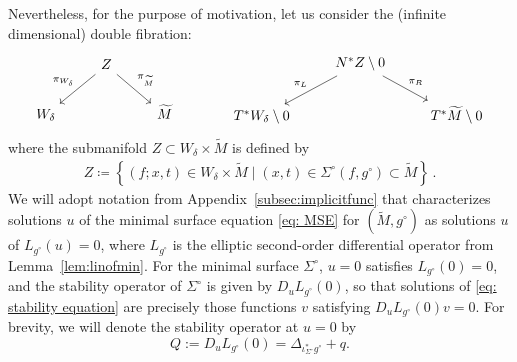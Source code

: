 \documentclass[11pt]{amsart}
\theoremstyle{definition}
\numberwithin{equation}{section}
\begin{document}
Nevertheless, for the purpose of motivation, let us consider the (infinite dimensional) double fibration:
\begin{equation} \label{df_diagrams_heu}
\begin{tabular}{cc}
\begin{tikzcd}
& Z \arrow[dl,swap,"\pi_{W_\delta}"] \arrow[dr,"\pi_{\widetilde{M}}"] \\
W_\delta && \widetilde{M}
\end{tikzcd} \qquad & \qquad
\begin{tikzcd}
& N^*Z\setminus 0 \arrow[dl,swap,"\pi_L"] \arrow[dr,"\pi_R"] \\
T^* W_\delta \setminus 0 && T^* \widetilde{M} \setminus 0
\end{tikzcd}
\end{tabular}
\end{equation}
where the submanifold $Z\subset W_\delta \times \widetilde{M}$ is defined by
\begin{eqnarray}\label{eq: manifold Z}
Z \coloneqq \left\{(f; x,t)\in W_\delta \times \widetilde{M}\mid (x,t) \in \Sigma^\circ(f,g^\circ) \subset \widetilde{M}\right\}\,.
\end{eqnarray}
We will adopt notation from Appendix~\ref{subsec:implicitfunc} that characterizes solutions $u$ of the minimal surface equation \eqref{eq: MSE} for $(\widetilde{M},g^\circ)$ as solutions $u$ of $L_{g^\circ}(u)=0$, where $L_{g^\circ}$ is the elliptic second-order differential operator from Lemma~\ref{lem:linofmin}. For the minimal surface $\Sigma^\circ$, $u=0$ satisfies $L_{g^\circ}(0)=0$, and the stability operator of $\Sigma^\circ$ is given by $D_uL_{g^\circ}(0)$, so that solutions of \eqref{eq: stability equation} are precisely those functions $v$ satisfying $D_uL_{g^\circ}(0)v=0$. For brevity, we will denote the stability operator at $u=0$ by 
\[
Q := D_uL_{g^\circ}(0) = \Delta_{\iota^\ast_{\Sigma^\circ}g^\circ}+q.
\]
\end{document}
